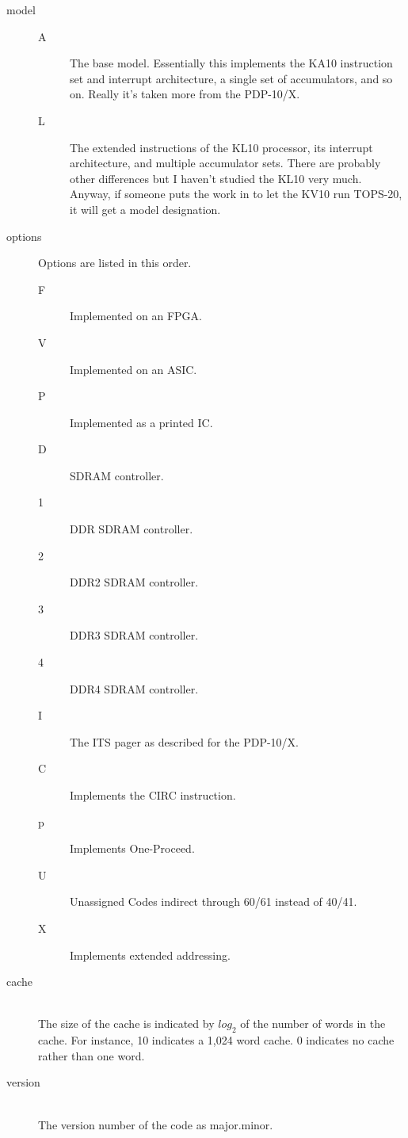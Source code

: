 \documentclass[12pt]{report}
\newcommand{\code}[1]{\textsf{#1}}
\begin{document}
\begin{description}
  \item[model] \hfill
    \begin{description}
      \item[A] The base model.  Essentially this implements the KA10 instruction set and
        interrupt architecture, a single set of accumulators, and so on.  Really it's
        taken more from the PDP-10/X.
      \item[L] The extended instructions of the KL10 processor, its interrupt
        architecture, and multiple accumulator sets.  There are probably other differences
        but I haven't studied the KL10 very much.  Anyway, if someone puts the work in to
        let the KV10 run TOPS-20, it will get a model designation.
    \end{description}
  \item[options] Options are listed in this order.
    \begin{description}
      \item[F] Implemented on an FPGA.
      \item[V] Implemented on an ASIC.
      \item[P] Implemented as a printed IC.
      \item[D] SDRAM controller.
      \item[1] DDR SDRAM controller.
      \item[2] DDR2 SDRAM controller.
      \item[3] DDR3 SDRAM controller.
      \item[4] DDR4 SDRAM controller.
      \item[I] The ITS pager as described for the PDP-10/X.
      \item[C] Implements the \code{CIRC} instruction.
      \item[p] Implements One-Proceed.
      \item[U] Unassigned Codes indirect through 60/61 instead of 40/41.
      \item[X] Implements extended addressing.
    \end{description}
  \item[cache] \hfill \\ The size of the cache is indicated by $log_2$ of the number of
    words in the cache.  For instance, 10 indicates a 1,024 word cache.  0 indicates no
    cache rather than one word.
  \item[version] \hfill \\
    The version number of the code as major.minor.
\end{description}
\end{document}
